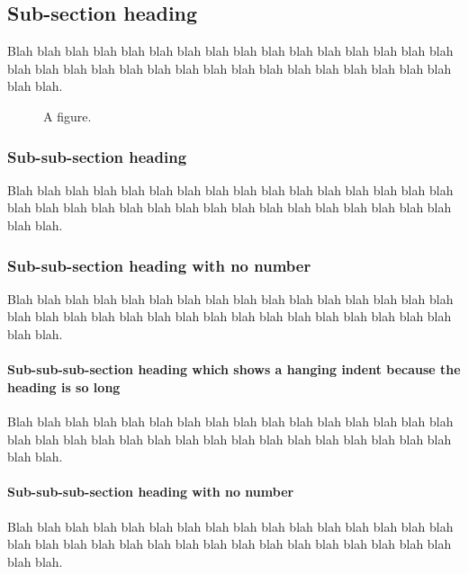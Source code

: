 \documentclass[pdfa]{drdc-report}
\begin{document}
\subsection{Sub-section heading}
Blah blah blah blah blah blah blah blah blah blah blah blah blah blah
blah blah blah blah blah blah blah blah blah blah blah blah blah blah
blah blah blah blah blah blah.

\begin{figure}[t]
 \begin{center}\end{center}
 \caption{A figure.}
\end{figure}

\subsubsection{Sub-sub-section heading}

Blah blah blah blah blah blah blah blah blah blah blah blah blah blah
blah blah blah blah blah blah blah blah blah blah blah blah blah blah
blah blah blah blah blah blah.

\subsubsection*{Sub-sub-section heading with no number}

Blah blah blah blah blah blah blah blah blah blah blah blah blah blah
blah blah blah blah blah blah blah blah blah blah blah blah blah blah
blah blah blah blah blah blah.

\paragraph{Sub-sub-sub-section heading which shows a hanging indent
because the heading is so long}

Blah blah blah blah blah blah blah blah blah blah blah blah blah blah
blah blah blah blah blah blah blah blah blah blah blah blah blah blah
blah blah blah blah blah blah.

 \paragraph*{Sub-sub-sub-section heading with no number}
Blah blah blah blah blah blah blah blah blah blah blah blah blah blah
blah blah blah blah blah blah blah blah blah blah blah blah blah blah
blah blah blah blah blah blah.
\end{document}
